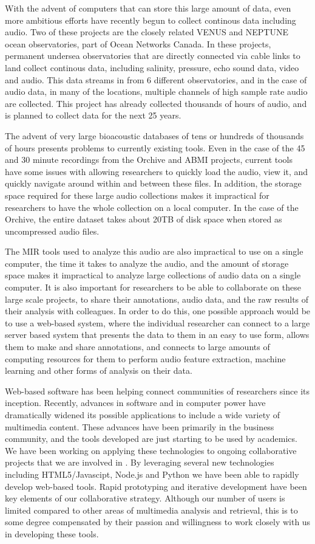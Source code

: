 With the advent of computers that can store this large amount of data,
even more ambitious efforts have recently begun to collect continous
data including audio.  Two of these projects are the closely related
VENUS and NEPTUNE ocean observatories, part of Ocean Networks Canada.
In these projects, permanent undersea observatories that are directly
connected via cable links to land collect continous data, including
salinity, pressure, echo sound data, video and audio.  This data
streams in from 6 different observatories, and in the case of audio
data, in many of the locations, multiple channels of high sample rate
audio are collected.  This project has already collected thousands of
hours of audio, and is planned to collect data for the next 25 years.

The advent of very large bioacoustic databases of tens or hundreds of
thousands of hours presents problems to currently existing tools.
Even in the case of the 45 and 30 minute recordings from the Orchive
and ABMI projects, current tools have some issues with allowing
researchers to quickly load the audio, view it, and quickly navigate
around within and between these files.  In addition, the storage space
required for these large audio collections makes it impractical for
researchers to have the whole collection on a local computer.  In the
case of the Orchive, the entire dataset takes about 20TB of disk space
when stored as uncompressed audio files.

The MIR tools used to analyze this audio are also impractical to use
on a single computer, the time it takes to analyze the audio, and the
amount of storage space makes it impractical to analyze large
collections of audio data on a single computer.  It is also important
for researchers to be able to collaborate on these large scale
projects, to share their annotations, audio data, and the raw results
of their analysis with colleagues.  In order to do this, one possible
approach would be to use a web-based system, where the individual
researcher can connect to a large server based system that presents
the data to them in an easy to use form, allows them to make and share
annotations, and connects to large amounts of computing resources for
them to perform audio feature extraction, machine learning and other
forms of analysis on their data.
 
Web-based software has been helping connect communities of researchers
since its inception.  Recently, advances in software and in computer
power have dramatically widened its possible applications to include a
wide variety of multimedia content.  These advances have been
primarily in the business community, and the tools developed are just
starting to be used by academics. We have been working on applying
these technologies to ongoing collaborative projects that we are
involved in \cite{sness2008}. By leveraging several new technologies
including HTML5/Javascipt, Node.js and Python we have been able to
rapidly develop web-based tools.  Rapid prototyping and iterative
development have been key elements of our collaborative
strategy. Although our number of users is limited compared to other
areas of multimedia analysis and retrieval, this is to some degree
compensated by their passion and willingness to work closely with us
in developing these tools.


